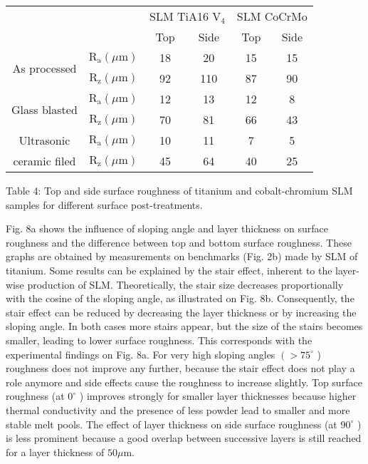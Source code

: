 \documentclass[10pt]{article}
\begin{document}
\begin{center}
\begin{tabular}{|c|c|c|c|c|c||}
\hline
\multicolumn{2}{|c|}{} & \multicolumn{2}{c|}{SLM TiA16 $\mathrm{V}_{4}$} & \multicolumn{2}{c|}{SLM CoCrMo} \\
\cline { 3 - 6 }
\multicolumn{2}{|c|}{} & Top & Side & Top & Side \\
\hline\hline
\multirow{2}{*}{As processed} & $\mathrm{R}_{\mathrm{a}}(\mu \mathrm{m})$ & 18 & 20 & 15 & 15 \\
 & $\mathrm{R}_{\mathrm{z}}(\mu \mathrm{m})$ & 92 & 110 & 87 & 90 \\
\hline
\multirow{2}{*}{Glass blasted} & $\mathrm{R}_{\mathrm{a}}(\mu \mathrm{m})$ & 12 & 13 & 12 & 8 \\
 & $\mathrm{R}_{\mathrm{z}}(\mu \mathrm{m})$ & 70 & 81 & 66 & 43 \\
\hline
Ultrasonic & $\mathrm{R}_{\mathrm{a}}(\mu \mathrm{m})$ & 10 & 11 & 7 & 5 \\
ceramic filed & $\mathrm{R}_{\mathrm{z}}(\mu \mathrm{m})$ & 45 & 64 & 40 & 25 \\
\hline
\end{tabular}
\end{center}

Table 4: Top and side surface roughness of titanium and cobalt-chromium SLM samples for different surface post-treatments.

Fig. 8a shows the influence of sloping angle and layer thickness on surface roughness and the difference between top and bottom surface roughness. These graphs are obtained by measurements on benchmarks (Fig. 2b) made by SLM of titanium. Some results can be explained by the stair effect, inherent to the layer-wise production of SLM. Theoretically, the stair size decreases proportionally with the cosine of the sloping angle, as illustrated on Fig. 8b. Consequently, the stair effect can be reduced by decreasing the layer thickness or by increasing the sloping angle. In both cases more stairs appear, but the size of the stairs becomes smaller, leading to lower surface roughness. This corresponds with the experimental findings on Fig. 8a. For very high sloping angles $\left(>75^{\circ}\right.$ ) roughness does not improve any further, because the stair effect does not play a role anymore and side effects cause the roughness to increase slightly. Top surface roughness (at $0^{\circ}$ ) improves strongly for smaller layer thicknesses because higher thermal conductivity and the presence of less powder lead to smaller and more stable melt pools. The effect of layer thickness on side surface roughness (at $90^{\circ}$ ) is less prominent because a good overlap between successive layers is still reached for a layer thickness of $50 \mu \mathrm{m}$.
\end{document}

